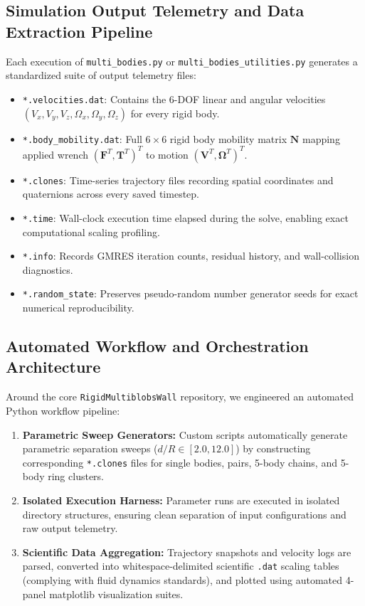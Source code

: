 \documentclass[11pt,a4paper]{article}
\begin{document}
\subsection{Simulation Output Telemetry and Data Extraction Pipeline}
Each execution of \texttt{multi\_bodies.py} or \texttt{multi\_bodies\_utilities.py} generates a standardized suite of output telemetry files:
\begin{itemize}
    \item \texttt{*.velocities.dat}: Contains the $6$-DOF linear and angular velocities $(V_x, V_y, V_z, \Omega_x, \Omega_y, \Omega_z)$ for every rigid body.
    \item \texttt{*.body\_mobility.dat}: Full $6 \times 6$ rigid body mobility matrix $\mathbf{N}$ mapping applied wrench $(\mathbf{F}^T, \mathbf{T}^T)^T$ to motion $(\mathbf{V}^T, \mathbf{\Omega}^T)^T$.
    \item \texttt{*.clones}: Time-series trajectory files recording spatial coordinates and quaternions across every saved timestep.
    \item \texttt{*.time}: Wall-clock execution time elapsed during the solve, enabling exact computational scaling profiling.
    \item \texttt{*.info}: Records GMRES iteration counts, residual history, and wall-collision diagnostics.
    \item \texttt{*.random\_state}: Preserves pseudo-random number generator seeds for exact numerical reproducibility.
\end{itemize}

\subsection{Automated Workflow and Orchestration Architecture}
Around the core \texttt{RigidMultiblobsWall} repository, we engineered an automated Python workflow pipeline:
\begin{enumerate}
    \item \textbf{Parametric Sweep Generators:} Custom scripts automatically generate parametric separation sweeps ($d/R \in [2.0, 12.0]$) by constructing corresponding \texttt{*.clones} files for single bodies, pairs, 5-body chains, and 5-body ring clusters.
    \item \textbf{Isolated Execution Harness:} Parameter runs are executed in isolated directory structures, ensuring clean separation of input configurations and raw output telemetry.
    \item \textbf{Scientific Data Aggregation:} Trajectory snapshots and velocity logs are parsed, converted into whitespace-delimited scientific \texttt{.dat} scaling tables (complying with fluid dynamics standards), and plotted using automated 4-panel matplotlib visualization suites.
\end{enumerate}
\end{document}
